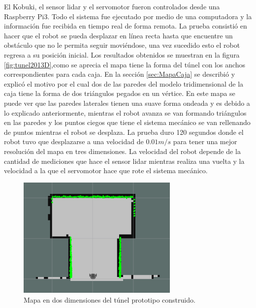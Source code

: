 El Kobuki, el sensor lidar y el servomotor fueron controlados desde una Raspberry Pi3. Todo 
el sistema fue ejecutado por medio de una computadora y la información fue recibida en tiempo 
real de forma remota. La prueba consistió en hacer que el robot se pueda desplazar en línea 
recta hasta que encuentre un obstáculo que no le permita seguir moviéndose, una vez sucedido 
esto el robot regresa a su posición inicial. Los resultados obtenidos se muestran en la figura
\ref{fig:tunel2013D},como se aprecia el mapa tiene la forma del túnel con los anchos correspondientes 
para cada caja. En la sección \ref{sec:MapaCaja} se describió y explicó el motivo por el cual dos 
de las paredes del modelo tridimensional de la caja tiene la forma de dos triángulos pegados en 
un vértice. En este mapa se puede ver que las paredes laterales tienen una suave forma ondeada 
y es debido a lo explicado anteriormente, mientras el robot avanza se van formando triángulos 
en las paredes y los puntos ciegos que tiene el sistema mecánico se van rellenando de puntos 
mientras el robot se desplaza. La prueba duro 120 segundos donde el robot tuvo que desplazarse 
a una velocidad de $0.01 m/s$ para tener una mejor resolución del mapa en tres dimensiones. La 
velocidad del robot depende de la cantidad de mediciones que hace el sensor lidar mientras 
realiza una vuelta y la velocidad a la que el servomotor hace que rote el sistema mecánico.

\begin{figure}
  \centering \footnotesize
  \includegraphics[width=0.70\textwidth]{images/slam2d.png}
  \captionsetup{font=footnotesize}
  \caption{Mapa en dos dimensiones del túnel prototipo construido.}
  \label{fig:SLAM201}
\end{figure}

